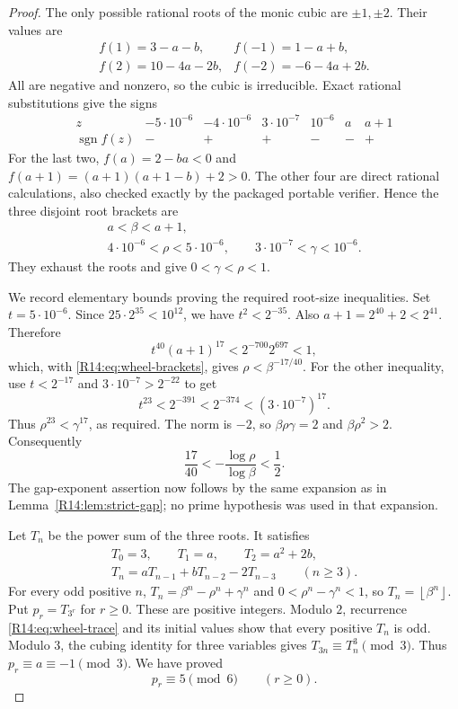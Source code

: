 \documentclass[11pt,a4paper]{article}
\theoremstyle{definition}\newtheorem{definition}[theorem]{Definition}
\theoremstyle{remark}\newtheorem{remark}[theorem]{Remark}
\newcommand{\floor}[1]{\left\lfloor#1\right\rfloor}
\begin{document}
\begin{proof}
The only possible rational roots of the monic cubic are
$\pm1,\pm2$. Their values are
\[
 \begin{array}{ll}
 f(1)=3-a-b,& f(-1)=1-a+b,\\
 f(2)=10-4a-2b,& f(-2)=-6-4a+2b.
 \end{array}
\]
All are negative and nonzero, so the cubic is irreducible.
Exact rational substitutions give the signs
\[
 \begin{array}{c|rrrrrr}
 z&-5\cdot10^{-6}&-4\cdot10^{-6}&3\cdot10^{-7}&10^{-6}&a&a+1\\
 \hline
 \operatorname{sgn}f(z)&-&+&+&-&-&+
 \end{array}
\]
For the last two, $f(a)=2-ba<0$ and
$f(a+1)=(a+1)(a+1-b)+2>0$. The other four are direct rational
calculations, also checked exactly by the packaged portable
verifier. Hence the three disjoint root brackets are
\begin{equation}\label{R14:eq:wheel-brackets}
 \begin{gathered}
 a<\beta<a+1,\\
 4\cdot10^{-6}<\rho<5\cdot10^{-6},\qquad
 3\cdot10^{-7}<\gamma<10^{-6}.
 \end{gathered}
\end{equation}
They exhaust the roots and give $0<\gamma<\rho<1$.

We record elementary bounds proving the required root-size
inequalities. Set $t=5\cdot10^{-6}$. Since
$25\cdot2^{35}<10^{12}$, we have $t^2<2^{-35}$.
Also $a+1=2^{40}+2<2^{41}$. Therefore
\[
 t^{40}(a+1)^{17}<2^{-700}2^{697}<1,
\]
which, with \eqref{R14:eq:wheel-brackets}, gives
$\rho<\beta^{-17/40}$. For the other inequality, use
$t<2^{-17}$ and $3\cdot10^{-7}>2^{-22}$ to get
\[
 t^{23}<2^{-391}<2^{-374}<(3\cdot10^{-7})^{17}.
\]
Thus $\rho^{23}<\gamma^{17}$, as required.
The norm is $-2$, so $\beta\rho\gamma=2$ and
$\beta\rho^2>2$. Consequently
\[
 \frac{17}{40}<-\frac{\log\rho}{\log\beta}<\frac12.
\]
The gap-exponent assertion now follows by the same expansion as in
Lemma~\ref{R14:lem:strict-gap}; no prime hypothesis was used in that
expansion.

Let $T_n$ be the power sum of the three roots. It satisfies
\begin{equation}\label{R14:eq:wheel-trace}
 \begin{gathered}
 T_0=3,\qquad T_1=a,\qquad T_2=a^2+2b,\\
 T_n=aT_{n-1}+bT_{n-2}-2T_{n-3}\qquad(n\ge3).
 \end{gathered}
\end{equation}
For every odd positive $n$,
$T_n=\beta^n-\rho^n+\gamma^n$ and
$0<\rho^n-\gamma^n<1$, so $T_n=\floor{\beta^n}$.
Put $p_r=T_{3^r}$ for $r\ge0$. These are positive integers.
Modulo $2$, recurrence \eqref{R14:eq:wheel-trace} and its initial
values show that every positive $T_n$ is odd. Modulo $3$, the
cubing identity for three variables gives
$T_{3n}\equiv T_n^3\pmod3$. Thus
$p_r\equiv a\equiv-1\pmod3$. We have proved
\begin{equation}\label{R14:eq:wheel-residues}
 p_r\equiv5\pmod6\qquad(r\ge0).
\end{equation}


\end{proof}
\end{document}
